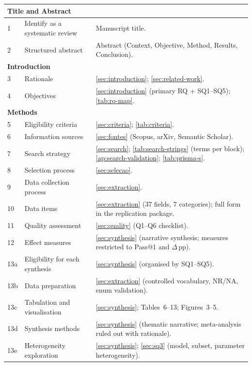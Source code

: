 \begin{longtable}{p{0.5cm}p{4.5cm}p{8.5cm}}
\multicolumn{3}{l}{\textbf{Title and Abstract}} \\
\midrule
1  & Identify as a systematic review
   & Manuscript title. \\
2  & Structured abstract
   & Abstract (Context, Objective, Method, Results, Conclusion). \\
\midrule
\multicolumn{3}{l}{\textbf{Introduction}} \\
\midrule
3  & Rationale
   & \autoref{sec:introduction}; \autoref{sec:related-work}. \\
4  & Objectives
   & \autoref{sec:introduction} (primary RQ + SQ1--SQ5); \autoref{tab:rq-map}. \\
\midrule
\multicolumn{3}{l}{\textbf{Methods}} \\
\midrule
5  & Eligibility criteria
   & \autoref{sec:criteria}; \autoref{tab:criteria}. \\
6  & Information sources
   & \autoref{sec:fontes} (Scopus, arXiv, Semantic Scholar). \\
7  & Search strategy
   & \autoref{sec:search}; \autoref{tab:search-strings} (terms per block);
     \autoref{ap:search-validation}; \autoref{tab:prisma-s}. \\
8  & Selection process
   & \autoref{sec:selecao}. \\
9  & Data collection process
   & \autoref{sec:extraction}. \\
10 & Data items
   & \autoref{sec:extraction} (37 fields, 7 categories); full form in the replication
     package. \\
11 & Quality assessment
   & \autoref{sec:quality} (Q1--Q6 checklist). \\
12 & Effect measures
   & \autoref{sec:synthesis} (narrative synthesis; measures restricted to Pass@1 and
     $\Delta$\,pp). \\
13a & Eligibility for each synthesis
    & \autoref{sec:synthesis} (organised by SQ1--SQ5). \\
13b & Data preparation
    & \autoref{sec:extraction} (controlled vocabulary, NR/NA, enum validation). \\
13c & Tabulation and visualisation
    & \autoref{sec:synthesis}; Tables~6--13; Figures~3--5. \\
13d & Synthesis methods
    & \autoref{sec:synthesis} (thematic narrative; meta-analysis ruled out with rationale). \\
13e & Heterogeneity exploration
    & \autoref{sec:synthesis}; \autoref{sec:sq3} (model, subset, parameter
      heterogeneity). \\

\end{longtable}

